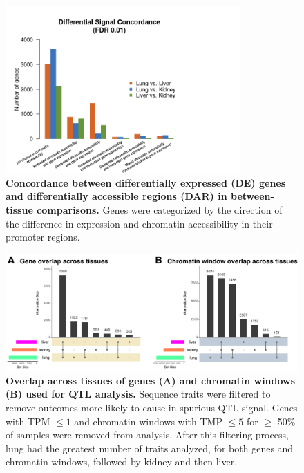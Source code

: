 \documentclass[9pt,twocolumn,twoside]{gsajnl}
\begin{document}
\begin{figure}[hp]
\renewcommand{\familydefault}{\sfdefault}\normalfont
\centering
\includegraphics[width=0.8\textwidth, trim={0in 0in 0in 0in}, clip]{figs/diff_concordance.png}
\caption{\textbf{Concordance between differentially expressed (DE) genes and differentially accessible regions (DAR) in between-tissue comparisons.} Genes were categorized by the direction of the difference in expression and chromatin accessibility in their promoter regions.\label{fig:diff_concordance}}
\end{figure}

\begin{figure}[hp]
\renewcommand{\familydefault}{\sfdefault}\normalfont
\centering
\includegraphics[width=\textwidth, trim={0in 0in 0in 0in}, clip]{figs/upset_genes_chromatin.pdf}
\caption{\textbf{Overlap across tissues of genes (A) and chromatin windows (B) used for QTL analysis.} Sequence traits were filtered to remove outcomes more likely to cause in spurious QTL signal. Genes with TPM $\le 1$ and chromatin windows with TMP $\le 5$ for $\ge$ 50\% of samples were removed from analysis. After this filtering process, lung had the greatest number of traits analyzed, for both genes and chromatin windows, followed by kidney and then liver. 
\label{fig:upset_genes_chromatin}}
\end{figure}
\end{document}
